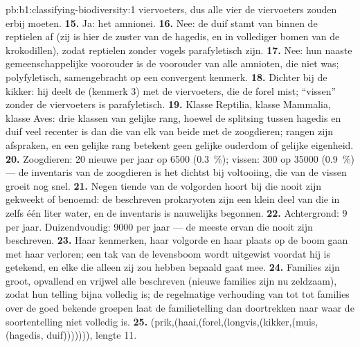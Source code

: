 \begin{solution}{pb:b1:classifying-biodiversity:1}
viervoeters, dus alle vier de viervoeters zouden erbij moeten.
\textbf{15.} Ja: het amnionei.
\textbf{16.} Nee: de duif stamt van binnen de reptielen af (zij is hier de
zuster van de hagedis, en in vollediger bomen van de krokodillen), zodat
reptielen zonder vogels parafyletisch zijn.
\textbf{17.} Nee: hun naaste gemeenschappelijke voorouder is de voorouder van
alle amnioten, die niet  was; polyfyletisch, samengebracht op een
convergent kenmerk.
\textbf{18.} Dichter bij de kikker: hij deelt de  (kenmerk 3) met de
viervoeters, die de forel mist; ``vissen'' zonder de viervoeters is
parafyletisch.
\textbf{19.} Klasse Reptilia, klasse Mammalia, klasse Aves: drie klassen van
gelijke rang, hoewel de splitsing tussen hagedis en duif veel recenter is dan
die van elk van beide met de zoogdieren; rangen zijn afspraken, en een
gelijke rang betekent geen gelijke ouderdom of gelijke eigenheid.
\textbf{20.} Zoogdieren: \num{20} nieuwe per jaar op \num{6500}
(\qty{0.3}{\%}); vissen: \num{300} op \num{35000} (\qty{0.9}{\%}) --- de
inventaris van de zoogdieren is het dichtst bij voltooiing, die van de vissen
groeit nog snel.
\textbf{21.} Negen tiende van de volgorden hoort bij  die nooit zijn
gekweekt of benoemd: de beschreven prokaryoten zijn een klein deel van die in
zelfs één liter water, en de inventaris is nauwelijks begonnen.
\textbf{22.} Achtergrond: \num{9} per jaar. Duizendvoudig: \num{9000} per
jaar --- de meeste ervan  die nooit zijn beschreven.
\textbf{23.} Haar kenmerken, haar volgorde en haar plaats op de boom gaan met
haar verloren; een tak van de levensboom wordt uitgewist voordat hij is
getekend, en elke  die alleen zij zou hebben bepaald gaat mee.
\textbf{24.} Families zijn groot, opvallend en vrijwel alle beschreven
(nieuwe families zijn nu zeldzaam), zodat hun telling bijna volledig is; de
regelmatige verhouding van  tot  tot families over de goed
bekende groepen laat de familietelling dan doortrekken naar  waar de
soortentelling niet volledig is.
\textbf{25.} (prik,(haai,(forel,(longvis,(kikker,(muis,(hagedis,
duif))))))), lengte \num{11}.
\end{solution}
